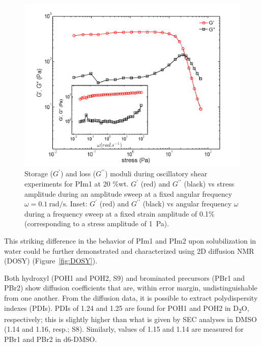 \documentclass[prl,a4paper,twocolumn,superscriptaddress,showkeys]{revtex4}
\begin{document}
\begin{figure}
\includegraphics[]{fig4}
\caption{Storage ($G^\prime$) and loss ($G^{\prime\prime}$) moduli during oscillatory shear experiments for  PIm1 at 20 \%wt. $G^\prime$ (red) and $G^{\prime\prime}$ (black) vs stress amplitude during an amplitude sweep at a fixed angular frequency $\omega=\SI{0.1}{\radian\per\second}$. Inset: $G^\prime$ (red) and $G^{\prime\prime}$ (black) vs angular frequency $\omega$ during a frequency sweep at a fixed strain amplitude of 0.1\% (corresponding to a stress amplitude of \SI{1}{\pascal}).}
\label{fig:linearrheol}
\end{figure}

This striking difference in the behavior of PIm1 and PIm2 upon solubilization in water could be further demonstrated and characterized using 2D diffusion NMR (DOSY) (Figure~\ref{fig:DOSY}).

Both hydroxyl (POH1 and POH2, S9) and brominated precursors (PBr1 and PBr2) show diffusion coefficients that are, within error margin, undistinguishable from one another. From the diffusion data, it is possible to extract polydispersity indexes (PDIs)\cite{Vieville2011}. PDIs of 1.24 and 1.25 are found for POH1 and POH2 in D\textsubscript{2}O, respectively; this is slightly higher than what is given by SEC analyses in DMSO (1.14 and 1.16, resp.; S8). Similarly, values of 1.15 and 1.14 are measured for PBr1 and PBr2 in d6-DMSO. 
\end{document}
